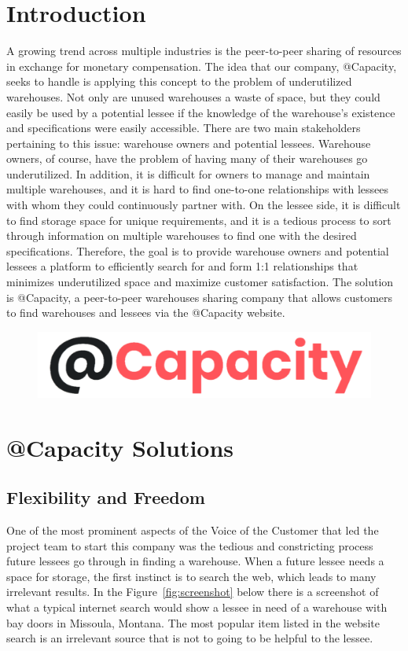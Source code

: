 \section{Introduction}
A growing trend across multiple industries is the peer-to-peer sharing of resources in exchange for monetary compensation. The idea that our company, @Capacity, seeks to handle is applying this concept to the problem of underutilized warehouses. Not only are unused warehouses a waste of space, but they could easily be used by a potential lessee if the knowledge of the warehouse's existence and specifications were easily accessible. There are two main stakeholders pertaining to this issue: warehouse owners and potential lessees. Warehouse owners, of course, have the problem of having many of their warehouses go underutilized. In addition, it is difficult for owners to manage and maintain multiple warehouses, and it is hard to find one-to-one relationships with lessees with whom they could continuously partner with. On the lessee side, it is difficult to find storage space for unique requirements, and it is a tedious process to sort through information on multiple warehouses to find one with the desired specifications. Therefore, the goal is to provide warehouse owners and potential lessees a platform to efficiently search for and form 1:1 relationships that minimizes underutilized space and maximize customer satisfaction. The solution is @Capacity, a peer-to-peer warehouses sharing company that allows customers to find warehouses and lessees via the @Capacity website.

\vspace{80px}
\begin{figure}[H]
\centering
\includegraphics[width=.65\textwidth]{Phase_3/Capacity_Logo_Trans.png}
\label{fig:@Capacity}
\end{figure}

\pagebreak
\section{@Capacity Solutions}
\subsection{Flexibility and Freedom}
One of the most prominent aspects of the Voice of the Customer that led the project team to start this company was the tedious and constricting process future lessees go through in finding a warehouse. When a future lessee needs a space for storage, the first instinct is to search the web, which leads to many irrelevant results. In the Figure~\ref{fig:screenshot} below there is a screenshot of what a typical internet search would show a lessee in need of a warehouse with bay doors in Missoula, Montana. The most popular item listed in the website search is an irrelevant source that is not to going to be helpful to the lessee. 

